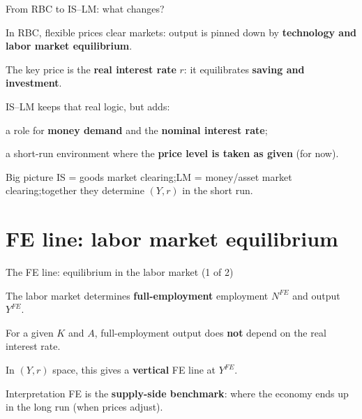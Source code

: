 \documentclass[aspectratio=169,xcolor=dvipsnames]{beamer}
\let\tempone\itemize
\let\temptwo\enditemize
\renewenvironment{itemize}{\tempone\addtolength{\itemsep}{\fill}}{\temptwo}
\begin{document}
\begin{frame}{From RBC to IS--LM: what changes?}
\begin{itemize}
\item In RBC, flexible prices clear markets: output is pinned down by \textbf{technology and labor market equilibrium}.
\item The key price is the \textbf{real interest rate} $r$: it equilibrates \textbf{saving and investment}.
\item IS--LM keeps that real logic, but adds:
\begin{itemize}
\item a role for \textbf{money demand} and the \textbf{nominal interest rate};
\item a short-run environment where the \textbf{price level is taken as given} (for now).
\end{itemize}
\end{itemize}

\begin{block}{Big picture}
IS = goods market clearing;\quad LM = money/asset market clearing;\quad together they determine $(Y,r)$ in the short run.
\end{block}
\end{frame}

\section{FE line: labor market equilibrium}

\begin{frame}{The FE line: equilibrium in the labor market (1 of 2)}
\begin{itemize}
\item The labor market determines \textbf{full-employment} employment $N^{FE}$ and output $Y^{FE}$.
\item For a given $K$ and $A$, full-employment output does \textbf{not} depend on the real interest rate.
\item In $(Y,r)$ space, this gives a \textbf{vertical} FE line at $Y^{FE}$.
\end{itemize}

\begin{block}{Interpretation}
FE is the \textbf{supply-side benchmark}: where the economy ends up in the long run (when prices adjust).
\end{block}
\end{frame}
\end{document}
